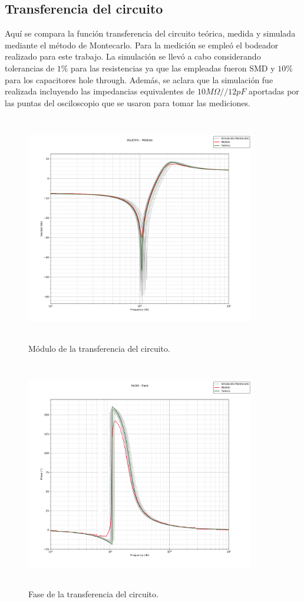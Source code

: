 
\subsection{Transferencia del circuito}

Aqu\'i se compara la funci\'on transferencia del circuito te\'orica, 
medida y simulada mediante el m\'etodo de Montecarlo. Para la medici\'on se emple\'o el bodeador realizado para este trabajo. La simulaci\'on se llev\'o a cabo considerando tolerancias de $1\%$ para las resistencias ya que las empleadas fueron SMD y $10\%$ para los capacitores hole through. Adem\'as, se aclara que la simulaci\'on fue realizada incluyendo las impedancias equivalentes de $10M\Omega // 12pF$ aportadas por las puntas del osciloscopio que se usaron para tomar las mediciones.

\begin{figure}[H] %
	\centering
	\includegraphics[width=10cm,height=10cm,keepaspectratio]{../EJ1/00GRAFICOS/vovi.png}
	\caption{M\'odulo de la transferencia del circuito.}
	\label{vovi_mod}
\end{figure}

\begin{figure}[H] %
	\centering
	\includegraphics[width=10cm,height=10cm,keepaspectratio]{../EJ1/00GRAFICOS/vovifase.jpg}
	\caption{Fase de la transferencia del circuito.}
	\label{vovi_fase}
\end{figure}

